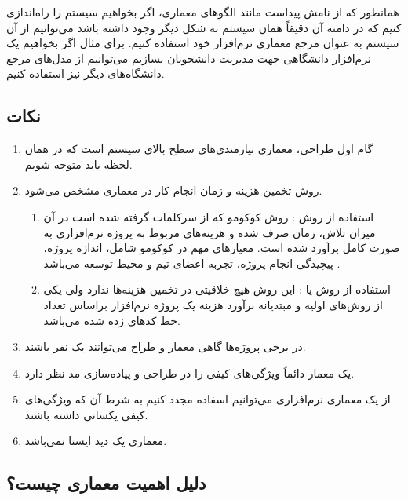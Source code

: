 همانطور که از نامش پیداست مانند الگو‌های معماری، اگر بخواهیم سیستم را راه‌اندازی
کنیم که در دامنه آن دقیقاً همان سیستم به شکل دیگر وجود داشته باشد می‌توانیم از
آن سیستم به عنوان مرجع معماری نرم‌افزار خود استفاده کنیم. برای مثال اگر بخواهیم
یک نرم‌افزار دانشگاهی جهت مدیریت دانشجویان بسازیم می‌توانیم از مدل‌های مرجع
دانشگاه‌های دیگر نیز استفاده کنیم.

\subsection*{نکات}

\begin{enumerate}
    \item گام اول طراحی، معماری نیازمندی‌های سطح بالای سیستم است که در همان لحظه
    باید متوجه شویم.
    \item روش تخمین هزینه و زمان انجام کار در معماری مشخص می‌شود.
    \begin{enumerate}
        \item استفاده از روش : روش کوکومو که از سرکلمات
         گرفته شده است در آن میزان تلاش، زمان صرف
        شده و هزینه‌های مربوط به پروژه نرم‌افزاری به صورت کامل برآورد شده است.
        معیار‌های مهم در کوکومو شامل، اندازه پروژه، پیچیدگی انجام پروژه، تجربه
        اعضای تیم و محیط توسعه می‌باشد \cite{COCOMO}.
        \item استفاده از روش  یا : این روش هیچ خلاقیتی
        در تخمین هزینه‌ها ندارد ولی یکی از روش‌های اولیه و مبتدیانه برآورد هزینه
        یک پروژه نرم‌افزار براساس تعداد خط کد‌های زده شده می‌باشد.
    \end{enumerate}
    \item در برخی پروژه‌ها گاهی معمار و طراح می‌توانند یک نفر باشند.
    \item یک معمار دائماً ویژگی‌های کیفی را در طراحی و پیاده‌سازی مد نظر دارد.
    \item از یک معماری نرم‌افزاری می‌توانیم اسفاده مجدد کنیم به شرط آن که
    ویژگی‌های کیفی یکسانی داشته باشند.
    \item معماری یک دید ایستا نمی‌باشد.
\end{enumerate}

\subsection{دلیل اهمیت معماری چیست؟}

